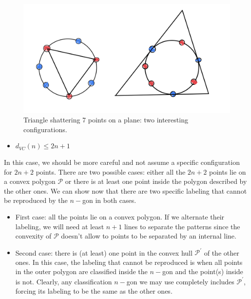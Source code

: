 \documentclass[11pt]{article}
\providecommand{\tightlist}{%
      \setlength{\itemsep}{0pt}\setlength{\parskip}{0pt}}
\begin{document}
 \begin{figure}
    \centering
    \includegraphics[scale=0.5]{Pset 3/IMG_0164.jpg}
    \caption{Triangle shattering 7 points on a plane: two interesting configurations.}
    \label{fig:my_label}
\end{figure}
        
    \begin{itemize}
\tightlist
\item
  \(d_{VC}(n)\le 2n+1\)
\end{itemize}

In this case, we should be more careful and not assume a specific
configuration for \(2n+2\) points. There are two possible cases: either
all the \(2n+2\) points lie on a convex polygon \(\mathcal{P}\) or there
is at least one point inside the polygon described by the other ones. We
can show now that there are two specific labeling that cannot be
reproduced by the \(n-\)gon in both cases.

\begin{itemize}
\item
  First case: all the points lie on a convex polygon. If we alternate
  their labeling, we will need at least \(n+1\) lines to separate the
  patterns since the convexity of \(\mathcal{P}\) doesn't allow to
  points to be separated by an internal line.
\item
  Second case: there is (at least) one point in the convex hull
  \(\mathcal{P}^\prime\) of the other ones. In this case, the labeling
  that cannot be reproduced is when all points in the outer polygon are
  classified inside the \(n-\)gon and the point(s) inside is not.
  Clearly, any classification \(n-\)gon we may use completely includes
  \(\mathcal{P}^\prime\), forcing its labeling to be the same as the
  other ones.
\end{itemize}
\end{document}
